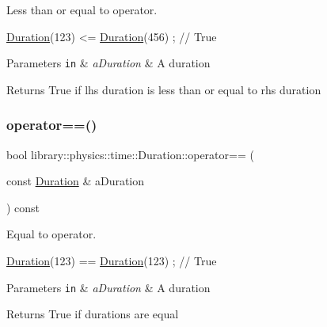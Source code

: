 Less than or equal to operator. 


\begin{DoxyCode}
\hyperlink{classlibrary_1_1physics_1_1time_1_1_duration_a0a70efcf487a841da572afcf00001f64}{Duration}(123) <= \hyperlink{classlibrary_1_1physics_1_1time_1_1_duration_a0a70efcf487a841da572afcf00001f64}{Duration}(456) ; \textcolor{comment}{// True}
\end{DoxyCode}



\begin{DoxyParams}[1]{Parameters}
\mbox{\tt in}  & {\em a\+Duration} & A duration \\
\hline
\end{DoxyParams}
\begin{DoxyReturn}{Returns}
True if lhs duration is less than or equal to rhs duration 
\end{DoxyReturn}
\mbox{\label{classlibrary_1_1physics_1_1time_1_1_duration_ac368d2fe8d2a04248dac2b53bdfbfb21}} 
\subsubsection{\texorpdfstring{operator==()}{operator==()}}
{\footnotesize\ttfamily bool library\+::physics\+::time\+::\+Duration\+::operator== (\begin{DoxyParamCaption}\item[{const \hyperlink{classlibrary_1_1physics_1_1time_1_1_duration}{Duration} \&}]{a\+Duration }\end{DoxyParamCaption}) const}



Equal to operator. 


\begin{DoxyCode}
\hyperlink{classlibrary_1_1physics_1_1time_1_1_duration_a0a70efcf487a841da572afcf00001f64}{Duration}(123) == \hyperlink{classlibrary_1_1physics_1_1time_1_1_duration_a0a70efcf487a841da572afcf00001f64}{Duration}(123) ; \textcolor{comment}{// True}
\end{DoxyCode}



\begin{DoxyParams}[1]{Parameters}
\mbox{\tt in}  & {\em a\+Duration} & A duration \\
\hline
\end{DoxyParams}
\begin{DoxyReturn}{Returns}
True if durations are equal 
\end{DoxyReturn}
\mbox{\label{classlibrary_1_1physics_1_1time_1_1_duration_ac7fa93e402efc7c23f1acb8df9b54c79}} 
